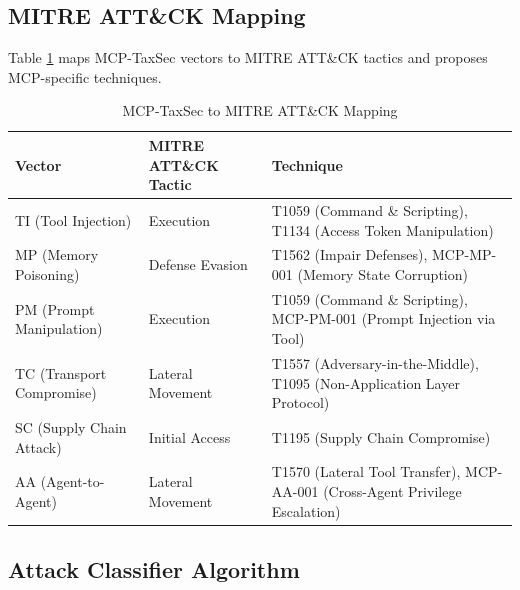 \documentclass[12pt,twocolumn,journal]{IEEEtran}
\begin{document}
\subsection{MITRE ATT\&CK Mapping}

Table \ref{tab:mitre_mapping} maps MCP-TaxSec vectors to MITRE ATT\&CK tactics and proposes MCP-specific techniques.

\begin{table}[!t]
\centering
\caption{MCP-TaxSec to MITRE ATT\&CK Mapping}
\label{tab:mitre_mapping}
\small
\begin{tabular}{p{2.8cm}|p{4.2cm}|p{8.5cm}}
\toprule
\textbf{Vector} & \textbf{MITRE ATT\&CK Tactic} & \textbf{Technique} \\
\midrule
TI (Tool Injection) & Execution & T1059 (Command \& Scripting), T1134 (Access Token Manipulation) \\
MP (Memory Poisoning) & Defense Evasion & T1562 (Impair Defenses), MCP-MP-001 (Memory State Corruption) \\
PM (Prompt Manipulation) & Execution & T1059 (Command \& Scripting), MCP-PM-001 (Prompt Injection via Tool) \\
TC (Transport Compromise) & Lateral Movement & T1557 (Adversary-in-the-Middle), T1095 (Non-Application Layer Protocol) \\
SC (Supply Chain Attack) & Initial Access & T1195 (Supply Chain Compromise) \\
AA (Agent-to-Agent) & Lateral Movement & T1570 (Lateral Tool Transfer), MCP-AA-001 (Cross-Agent Privilege Escalation) \\
\bottomrule
\end{tabular}
\end{table}

\subsection{Attack Classifier Algorithm}
\end{document}
